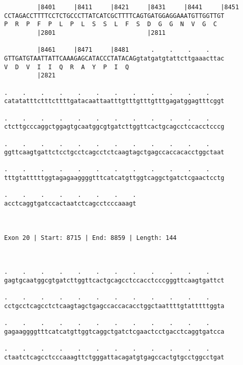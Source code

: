 \documentclass{article}
\begin{document}
\begin{Verbatim}
         |8401     |8411     |8421     |8431     |8441     |8451
CCTAGACCTTTTCCTCTGCCCTTATCATCGCTTTTCAGTGATGGAGGAAATGTTGGTTGT
P  R  P  F  P  L  P  L  S  S  L  F  S  D  G  G  N  V  G  C  
         |2801                         |2811                
  
         |8461     |8471     |8481      .    .    .    .    
GTTGATGTAATTATTCAAAGAGCATACCCTATACAGgtatgatgtattcttgaaacttac
V  D  V  I  I  Q  R  A  Y  P  I  Q                          
         |2821                                              
  
.    .    .    .    .    .    .    .    .    .    .    .    
catatatttctttcttttgatacaattaatttgtttgtttgtttgagatggagtttcggt
                                                            
.    .    .    .    .    .    .    .    .    .    .    .    
ctcttgcccaggctggagtgcaatggcgtgatcttggttcactgcagcctccacctcccg
                                                            
.    .    .    .    .    .    .    .    .    .    .    .    
ggttcaagtgattctcctgcctcagcctctcaagtagctgagccaccacacctggctaat
                                                            
.    .    .    .    .    .    .    .    .    .    .    .    
tttgtatttttggtagagaaggggtttcatcatgttggtcaggctgatctcgaactcctg
                                                            
.    .    .    .    .    .    .    .
acctcaggtgatccactaatctcagcctcccaaagt
                                    
                                    
 
Exon 20 | Start: 8715 | End: 8859 | Length: 144



.    .    .    .    .    .    .    .    .    .    .    .    
gagtgcaatggcgtgatcttggttcactgcagcctccacctcccgggttcaagtgattct
                                                            
.    .    .    .    .    .    .    .    .    .    .    .    
cctgcctcagcctctcaagtagctgagccaccacacctggctaattttgtatttttggta
                                                            
.    .    .    .    .    .    .    .    .    .    .    .    
gagaaggggtttcatcatgttggtcaggctgatctcgaactcctgacctcaggtgatcca
                                                            
.    .    .    .    .    .    .    .    .    .    .    .    
ctaatctcagcctcccaaagttctgggattacagatgtgagccactgtgcctggcctgat
                                                            

\end{Verbatim}
\end{document}
